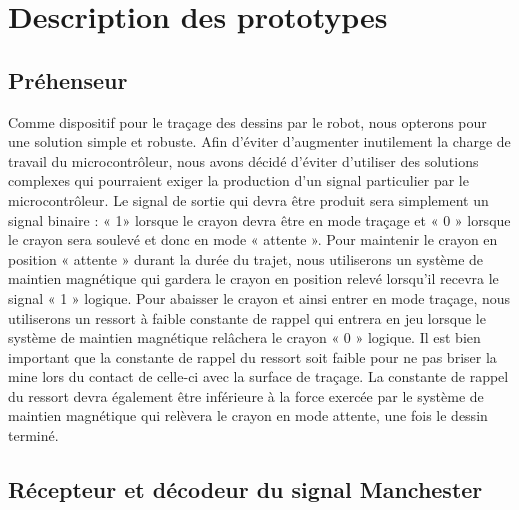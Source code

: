 


\chapter{Description des prototypes}
\label{s:prototypes}
\section{Préhenseur}

Comme dispositif pour le traçage des dessins par le robot, nous opterons pour une solution simple et robuste. Afin d’éviter d’augmenter inutilement la charge de travail du microcontrôleur, nous avons décidé d’éviter d’utiliser des solutions complexes qui pourraient exiger la production d’un signal particulier par le microcontrôleur. Le signal de sortie qui devra être produit sera simplement un signal binaire : « 1» lorsque le crayon devra être en mode traçage et « 0 » lorsque le crayon sera soulevé et donc en mode « attente ». Pour maintenir le crayon en position « attente » durant la durée du trajet, nous utiliserons un système de maintien magnétique qui gardera le crayon en position relevé lorsqu’il recevra le signal « 1 » logique. Pour abaisser le crayon et ainsi entrer en mode traçage, nous utiliserons un ressort à faible constante de rappel qui entrera en jeu lorsque le système de maintien magnétique relâchera le crayon « 0 » logique. Il est bien important que la constante de rappel du ressort soit faible pour ne pas briser la mine lors du contact de celle-ci avec la surface de traçage. La constante de rappel du ressort devra également être inférieure à la force exercée par le système de maintien magnétique qui relèvera le crayon en mode attente, une fois le dessin terminé.

\section{Récepteur et décodeur du signal Manchester}

